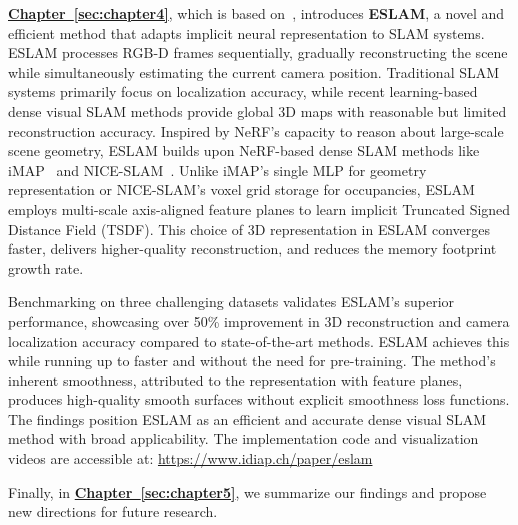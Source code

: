 \textbf{\hyperref[sec:chapter4]{Chapter~\ref{sec:chapter4}}}, which is based on~\cite{johari2023eslam}, introduces \textbf{ESLAM}, a novel and efficient method that adapts implicit neural representation to SLAM systems. ESLAM processes RGB-D frames sequentially, gradually reconstructing the scene while simultaneously estimating the current camera position. Traditional SLAM systems primarily focus on localization accuracy, while recent learning-based dense visual SLAM methods provide global 3D maps with reasonable but limited reconstruction accuracy. Inspired by NeRF's capacity to reason about large-scale scene geometry, ESLAM builds upon NeRF-based dense SLAM methods like iMAP~\citep{sucar2021imap} and NICE-SLAM~\citep{zhu2022nice}. Unlike iMAP's single MLP for geometry representation or NICE-SLAM's voxel grid storage for occupancies, ESLAM employs multi-scale axis-aligned feature planes to learn implicit Truncated Signed Distance Field (TSDF). This choice of 3D representation in ESLAM converges faster, delivers higher-quality reconstruction, and reduces the memory footprint growth rate.

Benchmarking on three challenging datasets validates ESLAM's superior performance, showcasing over 50\% improvement in 3D reconstruction and camera localization accuracy compared to state-of-the-art methods. ESLAM achieves this while running up to  faster and without the need for pre-training. The method's inherent smoothness, attributed to the representation with feature planes, produces high-quality smooth surfaces without explicit smoothness loss functions. The findings position ESLAM as an efficient and accurate dense visual SLAM method with broad applicability. The implementation code and visualization videos are accessible at: \href{https://www.idiap.ch/paper/eslam}{https://www.idiap.ch/paper/eslam}

Finally, in \textbf{\hyperref[sec:chapter5]{Chapter~\ref{sec:chapter5}}}, we summarize our findings and propose new directions for future research.